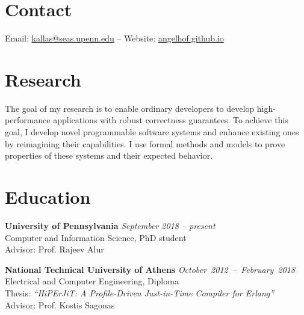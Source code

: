 \documentclass[margin]{res}
\begin{document}
\begin{resume}

\section{Contact} 
Email: \href{mailto:kallas@seas.upenn.edu}{kallas@seas.upenn.edu} -- Website: \href{https://angelhof.github.io/}{angelhof.github.io}

\section{Research}
The goal of my research is to enable ordinary developers to develop high-performance applications with robust correctness guarantees. To achieve this goal, I develop novel programmable software systems and enhance existing ones by reimagining their capabilities. I use formal methods and models to prove properties of these systems and their expected behavior.

\section{Education}
\textbf{University of Pennsylvania} \hfill {\em September 2018 -- present}\\
Computer and Information Science, PhD student \\
Advisor: Prof. Rajeev Alur


\textbf{National Technical University of Athens} \hfill \mbox{\em October 2012 -- February 2018}\\
Electrical and Computer Engineering, Diploma \\ %
Thesis: \textit{``HiPErJiT: A Profile-Driven Just-in-Time Compiler for Erlang''} \\
Advisor: Prof. Kostis Sagonas 


\end{resume}
\end{document}
